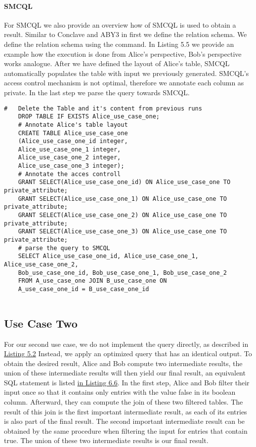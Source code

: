 \paragraph{SMCQL}
For SMCQL we also provide an overview how of SMCQL is used to obtain a result. Similar to Conclave and ABY3 in first we define the relation schema. We define the relation schema using the  command. In Listing 5.5 we provide an example how the execution is done from Alice's perspective, Bob's perspective works analogue. After we have defined the layout of Alice's table, SMCQL automatically populates the table with input we previously generated. SMCQL's access control mechanism is not optimal, therefore we annotate each column as private. In the last step we parse the query towards SMCQL.

\label{use_case1_sql}
\begin{lstlisting}[caption={Simplified Setup of SMCQL for our first use case }]
	#	Delete the Table and it's content from previous runs
	DROP TABLE IF EXISTS Alice_use_case_one;
	# Annotate Alice's table layout
	CREATE TABLE Alice_use_case_one
	(Alice_use_case_one_id integer, 
	Alice_use_case_one_1 integer, 
	Alice_use_case_one_2 integer, 
	Alice_use_case_one_3 integer);
	# Annotate the acces controll 
	GRANT SELECT(Alice_use_case_one_id) ON Alice_use_case_one TO private_attribute;
	GRANT SELECT(Alice_use_case_one_1) ON Alice_use_case_one TO private_attribute;
	GRANT SELECT(Alice_use_case_one_2) ON Alice_use_case_one TO private_attribute;
	GRANT SELECT(Alice_use_case_one_3) ON Alice_use_case_one TO private_attribute;
	# parse the query to SMCQL
	SELECT Alice_use_case_one_id, Alice_use_case_one_1, Alice_use_case_one_2, 
	Bob_use_case_one_id, Bob_use_case_one_1, Bob_use_case_one_2  
	FROM A_use_case_one JOIN B_use_case_one ON
	A_use_case_one_id = B_use_case_one_id 
	
\end{lstlisting}

\subsection{Use Case Two}
\label{use_case2}
For our second use case, we do not implement the query directly, as described in \hyperref[SQL2_label]{Listing 5.2}  Instead, we apply an optimized query that has an identical output. To obtain the desired result, Alice and Bob compute two intermediate results, the union of these intermediate results will then yield our final result, an equivalent SQL statement is listed \hyperref[use_case2_alternative_sql]{ in Listing 6.6}.
In the first step, Alice and Bob filter their input once so that it contains only entries with the value false in its boolean column. Afterward, they can compute the join of these two filtered tables. The result of this join is the first important intermediate result, as each of its entries is also part of the final result. The second important intermediate result can be obtained by the same procedure when filtering the input for entries that contain true.
The union of these two intermediate results is our final result. 

